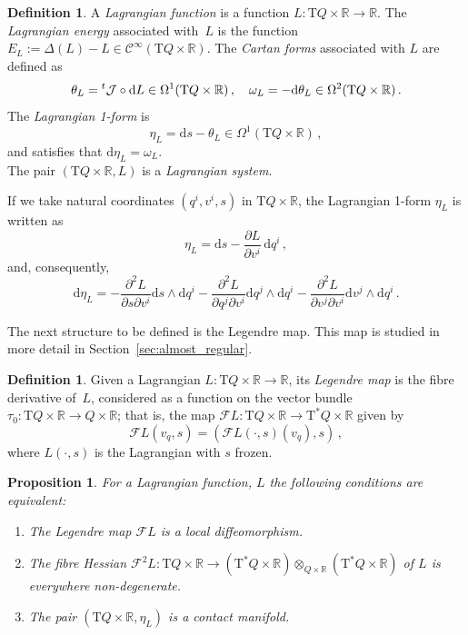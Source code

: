 \documentclass[11pt]{article}
\theoremstyle{plain}
\newtheorem{proposition}[theorem]{Proposition}
\theoremstyle{definition}
\newtheorem{definition}[theorem]{Definition}
\newcommand{\R}{\mathbb{R}}
\renewcommand{\d}{\mathrm{d}}
\newcommand{\Cinfty}{\mathscr{C}^\infty}
\newcommand{\T}{{\mathrm T}}
\newcommand{\cT}{\T^{\ast}}
\newcommand{\F}{\mathcal{F}}
\def\d{\mathrm{d}}
\def\d{\mathrm{d}}
\begin{document}
\begin{definition}
\label{dfn:lagrangian-function}
A {\sl Lagrangian function} 
is a function $L \colon\T Q\times\R\to\R$. The {\sl Lagrangian energy}
associated with~$L$ is the function $E_L := \Delta(L)-L\in\Cinfty(\T Q\times\R)$. The {\sl Cartan forms}
associated with $L$ are defined as
\begin{equation}
\label{eq:thetaL}
\theta_L = 
{}^t{\cal J} \circ \d L 
\in \Omega^1(\T Q\times\R) 
\,,\quad
\omega_L = 
-\d \theta_L
\in \Omega^2(\T Q\times\R) 
\,.
\end{equation}
The {\sl Lagrangian 1-form} is
$$
\eta_L=\d s-\theta_L\in\Omega^1(\T Q\times\R)
\,,
$$
and satisfies that $\d\eta_L=\omega_L$.
\\
The pair $(\T Q\times\R,L)$ is a {\sl Lagrangian system}.
\end{definition}

If we take natural coordinates $(q^i, v^i, s)$ in $\T Q\times\R$, 
the Lagrangian 1-form $\eta_L$ is written as
\begin{equation}
\label{eq:etaL}
\eta_L = \d s - \frac{\partial L}{\partial v^i} \,\d q^i \,,
\end{equation}
and, consequently,
\begin{equation*}
\d\eta_L = 
-\frac{\partial^2L}{\partial s\partial v^i}\d s\wedge\d q^i 
-\frac{\partial^2L}{\partial q^j\partial v^i}\d q^j\wedge\d q^i 
-\frac{\partial^2L}{\partial v^j\partial v^i}\d v^j\wedge\d q^i\,.
\end{equation*}

The next structure to be defined is the Legendre map. This map is studied in more detail in Section~\ref{sec:almost_regular}.

\begin{definition}
Given a Lagrangian 
$L \colon \T Q\times\R \to \R$, 
its {\sl Legendre map}
is the fibre derivative of~$L$,
considered as a function on the vector bundle
$\tau_0 \colon \T Q\times\R \to Q \times \R$;
that is, the map
$\F L \colon \T Q \times\R \to \cT Q \times \R$ 
given by
$$
    \F L (v_q,s) = \left( \F L(\cdot,s) (v_q),s \right)\,,
$$
where $L(\cdot,s)$ is the Lagrangian with $s$ frozen.
\end{definition}

\begin{proposition}\label{Prop-regLag}
For a Lagrangian function, $L$ the following conditions are equivalent:
\begin{enumerate}[(1)]
\item
The Legendre map
$\F L$ is a local diffeomorphism.
\item The fibre Hessian $\F^2L \colon
\T Q\times\R \longrightarrow (\cT Q\times\R)\otimes_{Q\times\R} (\cT Q\times\R)$ of $L$ is everywhere non-degenerate.
\item The pair $(\T Q\times\R,\eta_L)$ is a contact manifold.
\end{enumerate}
\end{proposition}
\end{document}
